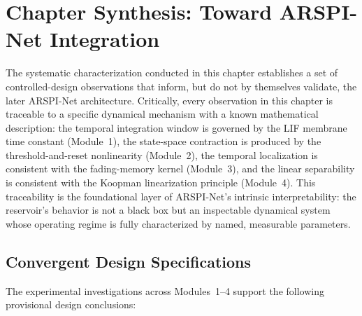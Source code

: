 \section{Chapter Synthesis: Toward ARSPI-Net Integration}
\label{sec:chapter3_synthesis}

The systematic characterization conducted in this chapter establishes a set of controlled-design observations that inform, but do not by themselves validate, the later ARSPI-Net architecture. Critically, every observation in this chapter is traceable to a specific dynamical mechanism with a known mathematical description: the temporal integration window is governed by the LIF membrane time constant (Module~1), the state-space contraction is produced by the threshold-and-reset nonlinearity (Module~2), the temporal localization is consistent with the fading-memory kernel (Module~3), and the linear separability is consistent with the Koopman linearization principle (Module~4). This traceability is the foundational layer of ARSPI-Net's intrinsic interpretability: the reservoir's behavior is not a black box but an inspectable dynamical system whose operating regime is fully characterized by named, measurable parameters.

\subsection{Convergent Design Specifications}
\label{sec:design_specifications}

The experimental investigations across Modules~1--4 support the following provisional design conclusions:

